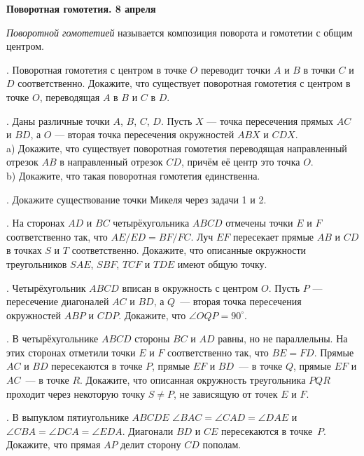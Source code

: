 \centerline{\bf Поворотная гомотетия. 8 апреля}

\begin{definition}
{\it Поворотной гомотетией} называется композиция поворота и гомотетии с общим центром. 
\end{definition}

. Поворотная гомотетия с центром в точке $O$ переводит точки 
$A$ и $B$ в точки $C$ и $D$ соответственно. Докажите, что существует 
поворотная гомотетия с центром в точке $O$, переводящая $A$ в $B$ и $C$ в $D$.

. Даны различные точки $A$, $B$, $C$, $D$. Пусть $X$ --- точка пересечения 
прямых $AC$ и $BD$, а $O$ --- вторая точка пересечения окружностей $ABX$ и $CDX$.\\
a) Докажите, что существует поворотная гомотетия переводящая направленный 
отрезок $AB$ в направленный отрезок $CD$, причём её центр это точка $O$.\\
b) Докажите, что такая поворотная гомотетия единственна.

. Докажите существование точки Микеля через задачи 1 и 2.

. На сторонах $AD$ и $BC$ четырёхугольника $ABCD$ отмечены точки 
$E$ и $F$ соответственно так, что $AE/ED=BF/FC$. Луч $EF$ пересекает 
прямые $AB$ и $CD$ в точках $S$ и $T$ соответственно. Докажите, что
описанные окружности треугольников $SAE$, $SBF$, $TCF$ и $TDE$ имеют общую точку.

. Четырёхугольник $ABCD$ вписан в окружность с центром $O$. 
Пусть $P$ --- пересечение диагоналей $AC$ и $BD$, а $Q$~--- 
вторая точка пересечения окружностей $ABP$ и $CDP$. Докажите, что $\angle OQP=90^\circ$.

. В четырёхугольнике $ABCD$ стороны $BC$ и $AD$ равны, но не параллельны. 
На этих сторонах отметили точки $E$ и $F$ соответственно так, что $BE=FD$. 
Прямые $AC$ и $BD$ пересекаются в точке $P$, прямые $EF$ и $BD$~--- в точке
$Q$, прямые $EF$ и $AC$~--- в точке $R$. Докажите, что описанная окружность треугольника $PQR$
проходит через некоторую точку $S\neq P$, не зависящую от точек $E$ и $F$.

. В выпуклом пятиугольнике $ABCDE$ $\angle BAC=\angle CAD=\angle DAE$ и 
$\angle CBA=\angle DCA=\angle EDA$. Диагонали $BD$ и $CE$ пересекаются в точке~$P$.
Докажите, что прямая $AP$ делит сторону $CD$ пополам.



 
